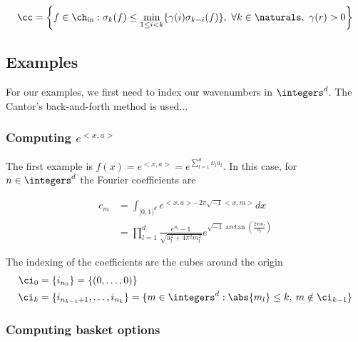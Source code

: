 \documentclass[final]{elsarticle}
\newcommand{\chin}{\ch_{\text{\rm{in}}}}
\theoremstyle{definition}
\theoremstyle{remark}
\begin{document}
\begin{equation}
\cc = \left\{ f \in \chin : \sigma_k(f) \le \min_{1 \le i < k}\{\gamma(i)\sigma_{k-i}(f)\}, \ \forall k \in \naturals, \ \gamma(r) > 0 \right\}
\end{equation}

\subsection{Examples}

For our examples, we first need to index our wavenumbers in $\integers^d$. The Cantor's back-and-forth method is used...

\subsubsection{Computing $e^{<x,a>}$}

The first example is $f(x)=e^{<x,a>}=e^{\sum_{l=1}^dx_la_l}$. In this case, for $n\in\integers^d$ the Fourier coefficients are

\begin{align*}
c_m&=\int_{[0,1)^d}e^{<x,a>-2\pi\sqrt{-1}<x,m>}dx\\
    &=\prod_{l=1}^{d}\frac{e^{a_l}-1}{\sqrt{a_l^2+4\pi^2m_l^2}}e^{\sqrt{-1}\arctan{\left(\frac{2\pi m_l}{a_l}\right)}}
\end{align*}

The indexing of the coefficients are the cubes around the origin
\begin{align*}
\ci_0&=\{i_{n_0}\}=\{(0,\dots,0)\} \\
\ci_k&=\{i_{n_{k-1}+1},\dots,i_{n_k}\}=\{m\in\integers^d: \abs{m_l} \le k,\: m\notin \ci_{k-1}\}
\end{align*}

\subsubsection{Computing basket options}




\end{document}
